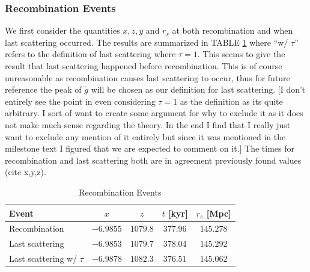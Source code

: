 \documentclass[%
reprint,
 amsmath,amssymb,
 aps,
]{revtex4-2}
\begin{document}
\subsubsection{Recombination Events}
We first consider the quantities $x,z,y$ and $r_s$ at both recombination and when last scattering occurred. The results are summarized in TABLE \ref{tab:recombination_events} where ``w/ $\tau$'' refers to the definition of last scattering where $\tau=1$. This seems to give the result that last scattering happened before recombination. This is of course unreasonable as recombination causes last scattering to occur, thus for future reference the peak of $\tilde g$ will be chosen as our definition for last scattering. \color{red}[I don't entirely see the point in even considering $\tau=1$ as the definition as its quite arbitrary. I sort of want to create some argument for why to exclude it as it does not make much sense regarding the theory. In the end I find that I really just want to exclude any mention of it entirely but since it was mentioned in the milestone text I figured that we are expected to comment on it.]  \color{black}The times for recombination and last scattering both are in agreement previously found values (cite x,y,z).
\renewcommand{\arraystretch}{1.25}
\begin{table}[ht!]
	\caption{Recombination Events}
	\label{tab:recombination_events}
	\begin{tabular}{|l|c|c|c|c|}
		\hline
		Event                               & $x$       & $z$      & $t$ [kyr] & $r_s$ [Mpc] \\\hline
		Recombination                & $-6.9855$ & $1079.8$ & $377.96$  & $145.278$   \\\hline
		Last scattering                 & $-6.9853$ & $1079.7$ & $378.04$  & $145.292$   \\\hline
		Last scattering w/ $\tau$ & $-6.9878$ & $1082.3$ & $376.51$  & $145.062$   \\\hline
	\end{tabular}
\end{table}
\end{document}
